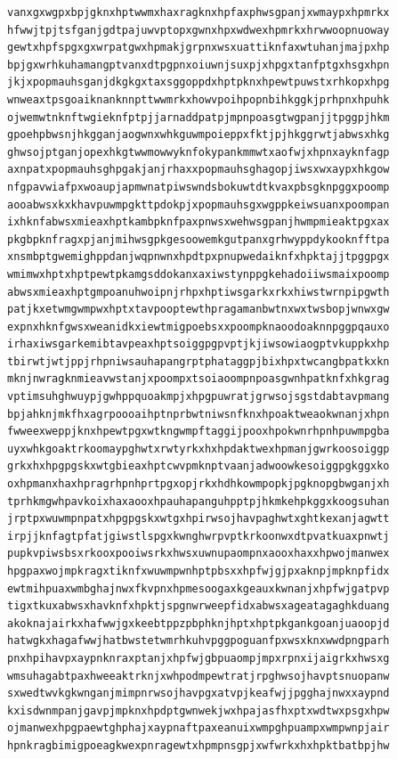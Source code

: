 \documentclass[11pt,letterpaper]{exam}
\begin{document}
\begin{questions}
\begin{verbatim}
vanxgxwgpxbpjgknxhptwwmxhaxragknxhpfaxphwsgpanjxwmaypxhpmrkx
hfwwjtpjtsfganjgdtpajuwvptopxgwnxhpxwdwexhpmrkxhrwwoopnuoway
gewtxhpfspgxgxwrpatgwxhpmakjgrpnxwsxuattiknfaxwtuhanjmajpxhp
bpjgxwrhkuhamangptvanxdtpgpnxoiuwnjsuxpjxhpgxtanfptgxhsgxhpn
jkjxpopmauhsganjdkgkgxtaxsggoppdxhptpknxhpewtpuwstxrhkopxhpg
wnweaxtpsgoaiknanknnpttwwmrkxhowvpoihpopnbihkggkjprhpnxhpuhk
ojwemwtnknftwgieknfptpjjarnaddpatpjmpnpoasgtwgpanjjtpggpjhkm
gpoehpbwsnjhkgganjaogwnxwhkguwmpoieppxfktjpjhkggrwtjabwsxhkg
ghwsojptganjopexhkgtwwmowwyknfokypankmmwtxaofwjxhpnxayknfagp
axnpatxpopmauhsghpgakjanjrhaxxpopmauhsghagopjiwsxwxaypxhkgow
nfgpavwiafpxwoaupjapmwnatpiwswndsbokuwtdtkvaxpbsgknpggxpoomp
aooabwsxkxkhavpuwmpgkttpdokpjxpopmauhsgxwgppkeiwsuanxpoompan
ixhknfabwsxmieaxhptkambpknfpaxpnwsxwehwsgpanjhwmpmieaktpgxax
pkgbpknfragxpjanjmihwsgpkgesoowemkgutpanxgrhwyppdykooknfftpa
xnsmbptgwemighppdanjwqpnwnxhpdtpxpnupwedaiknfxhpktajjtpggpgx
wmimwxhptxhptpewtpkamgsddokanxaxiwstynppgkehadoiiwsmaixpoomp
abwsxmieaxhptgmpoanuhwoipnjrhpxhptiwsgarkxrkxhiwstwrnpipgwth
patjkxetwmgwmpwxhptxtavpooptewthpragamanbwtnxwxtwsbopjwnwxgw
expnxhknfgwsxweanidkxiewtmigpoebsxxpoompknaoodoaknnpggpqauxo
irhaxiwsgarkemibtavpeaxhptsoiggpgpvptjkjiwsowiaogptvkuppkxhp
tbirwtjwtjppjrhpniwsauhapangrptphataggpjbixhpxtwcangbpatkxkn
mknjnwragknmieavwstanjxpoompxtsoiaoompnpoasgwnhpatknfxhkgrag
vptimsuhghwuypjgwhppquoakmpjxhpgpuwratjgrwsojsgstdabtavpmang
bpjahknjmkfhxagrpoooaihptnprbwtniwsnfknxhpoaktweaokwnanjxhpn
fwweexweppjknxhpewtpgxwtkngwmpftaggijpooxhpokwnrhpnhpuwmpgba
uyxwhkgoaktrkoomaypghwtxrwtyrkxhxhpdaktwexhpmanjgwrkoosoiggp
grkxhxhpgpgskxwtgbieaxhptcwvpmknptvaanjadwoowkesoiggpgkggxko
oxhpmanxhaxhpragrhpnhprtpgxopjrkxhdhkowmpopkjpgknopgbwganjxh
tprhkmgwhpavkoixhaxaooxhpauhapanguhpptpjhkmkehpkggxkoogsuhan
jrptpxwuwmpnpatxhpgpgskxwtgxhpirwsojhavpaghwtxghtkexanjagwtt
irpjjknfagtpfatjgiwstlspgxkwnghwrpvptkrkoonwxdtpvatkuaxpnwtj
pupkvpiwsbsxrkooxpooiwsrkxhwsxuwnupaompnxaooxhaxxhpwojmanwex
hpgpaxwojmpkragxtiknfxwuwmpwnhptpbsxxhpfwjgjpxaknpjmpknpfidx
ewtmihpuaxwmbghajnwxfkvpnxhpmesoogaxkgeauxkwnanjxhpfwjgatpvp
tigxtkuxabwsxhavknfxhpktjspgnwrweepfidxabwsxageatagaghkduang
akoknajairkxhafwwjgxkeebtppzpbphknjhptxhptpkgankgoanjuaoopjd
hatwgkxhagafwwjhatbwstetwmrhkuhvpggpoguanfpxwsxknxwwdpngparh
pnxhpihavpxaypnknraxptanjxhpfwjgbpuaompjmpxrpnxijaigrkxhwsxg
wmsuhagabtpaxhweeaktrknjxwhpodmpewtratjrpghwsojhavptsnuopanw
sxwedtwvkgkwnganjmimpnrwsojhavpgxatvpjkeafwjjpgghajnwxxaypnd
kxisdwnmpanjgavpjmpknxhpdptgwnwekjwxhpajasfhxptxwdtwxpsgxhpw
ojmanwexhpgpaewtghphajxaypnaftpaxeanuixwmpghpuampxwmpwnpjair
hpnkragbimigpoeagkwexpnragewtxhpmpnsgpjxwfwrkxhxhpktbatbpjhw

\end{verbatim}
\end{questions}
\end{document}
